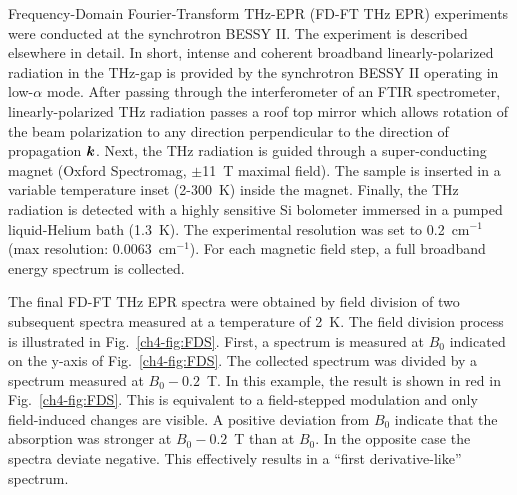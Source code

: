 Frequency-Domain Fourier-Transform THz-EPR (FD-FT THz EPR) experiments were conducted at the synchrotron BESSY II. The experiment is described elsewhere in detail. \cite{Schnegg09,Nehrkorn13,NEHRKORN201710} In short, intense and coherent broadband linearly-polarized radiation in the THz-gap is provided by the synchrotron BESSY II operating in low-$\alpha$ mode. \cite{AboBakr02} After passing through the interferometer of an FTIR spectrometer, linearly-polarized THz radiation passes a roof top mirror which allows rotation of the beam polarization to any direction perpendicular to the direction of propagation $\boldsymbol{k}$. Next, the THz radiation is guided through a super-conducting magnet (Oxford Spectromag, $\pm$11~T maximal field). The sample is inserted in a variable temperature inset (2-300~K) inside the magnet. Finally, the THz radiation is detected with a highly sensitive Si bolometer immersed in a pumped liquid-Helium bath (1.3~K). The experimental resolution was set to 0.2~cm$^{-1}$ (max resolution: 0.0063~cm$^{-1}$). For each magnetic field step, a full broadband energy spectrum is collected. 

The final FD-FT THz EPR spectra were obtained by field division of two subsequent spectra measured at a temperature of 2~K. The field division process is illustrated in Fig.~\ref{ch4-fig:FDS}. First, a spectrum is measured at $B_0$ indicated on the y-axis of Fig.~\ref{ch4-fig:FDS}. The collected spectrum was divided by a spectrum measured at $B_0 - 0.2$~T. In this example, the result is shown in red in Fig.~\ref{ch4-fig:FDS}. This is equivalent to a field-stepped modulation and only field-induced changes are visible. A positive deviation from $B_0$ indicate that the absorption was stronger at $B_0 - 0.2$~T than at $B_0$. In the opposite case the spectra deviate negative. This effectively results in a ``first derivative-like'' spectrum.

